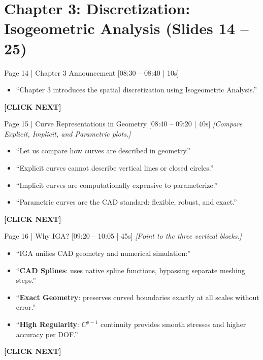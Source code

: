 \documentclass[9pt,a4paper]{article}
\begin{document}
\section*{Chapter 3: Discretization: Isogeometric Analysis (Slides 14 -- 25)}

\begin{slidebox}{Page 14 | Chapter 3 Announcement \hfill [08:30 -- 08:40 | 10s]}
\begin{itemize}
  \item ``Chapter 3 introduces the spatial discretization using Isogeometric Analysis.''
\end{itemize}
\textbf{\color{cnamred}[CLICK NEXT]}
\end{slidebox}

\begin{slidebox}{Page 15 | Curve Representations in Geometry \hfill [08:40 -- 09:20 | 40s]}
\textit{[Compare Explicit, Implicit, and Parametric plots.]}
\begin{itemize}
  \item ``Let us compare how curves are described in geometry.''
  \item ``Explicit curves cannot describe vertical lines or closed circles.''
  \item ``Implicit curves are computationally expensive to parameterize.''
  \item ``Parametric curves are the CAD standard: flexible, robust, and exact.''
\end{itemize}
\textbf{\color{cnamred}[CLICK NEXT]}
\end{slidebox}

\begin{slidebox}{Page 16 | Why IGA? \hfill [09:20 -- 10:05 | 45s]}
\textit{[Point to the three vertical blocks.]}
\begin{itemize}
  \item ``IGA unifies CAD geometry and numerical simulation:''
  \item ``\textbf{CAD Splines}: uses native spline functions, bypassing separate meshing steps.''
  \item ``\textbf{Exact Geometry}: preserves curved boundaries exactly at all scales without error.''
  \item ``\textbf{High Regularity}: $C^{p-1}$ continuity provides smooth stresses and higher accuracy per DOF.''
\end{itemize}
\textbf{\color{cnamred}[CLICK NEXT]}
\end{slidebox}
\end{document}
